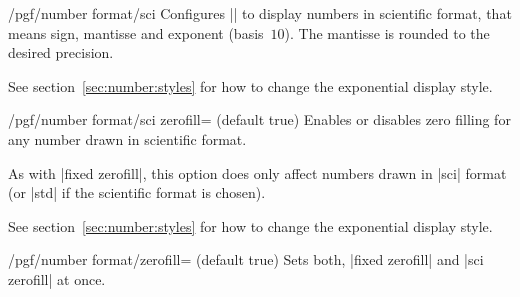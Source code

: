 \begin{key}{/pgf/number format/sci}
Configures |\pgfmathprintnumber| to display numbers in scientific format, that means sign, mantisse and exponent (basis~$10$). The mantisse is rounded to the desired precision.

\begin{codeexample}[]
\hspace{1em}
\hspace{1em}
\hspace{1em}
\hspace{1em}
\end{codeexample}

See section~\ref{sec:number:styles} for how to change the exponential display style.
\end{key}

\begin{key}{/pgf/number format/sci zerofill=  (default true)}
Enables or disables zero filling for any number drawn in scientific format.

\begin{codeexample}[]
\hspace{1em}
\hspace{1em}
\hspace{1em}
\hspace{1em}
\end{codeexample}
As with |fixed zerofill|, this option does only affect numbers drawn in |sci| format (or |std| if the scientific format is chosen).

See section~\ref{sec:number:styles} for how to change the exponential display style.
\end{key}

\begin{stylekey}{/pgf/number format/zerofill= (default true)}
	Sets both, |fixed zerofill| and |sci zerofill| at once.
\end{stylekey}

